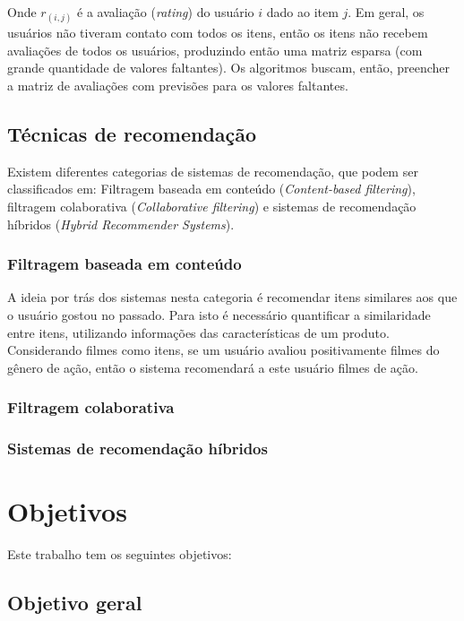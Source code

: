 \documentclass[12pt,a4paper,header]{abnt}
\begin{document}
Onde $r_{(i, j)}$ é a avaliação (\textit{rating}) do usuário $i$ dado ao item $j$. Em geral, os usuários não tiveram contato com todos os itens, então os itens não recebem avaliações de todos os usuários, produzindo então uma matriz esparsa (com grande quantidade de valores faltantes). Os algoritmos buscam, então, preencher a matriz de avaliações com previsões para os valores faltantes.

\section{Técnicas de recomendação}

Existem diferentes categorias de sistemas de recomendação, que podem ser classificados em: Filtragem baseada em conteúdo (\textit{Content-based filtering}), filtragem colaborativa (\textit{Collaborative filtering}) e sistemas de recomendação híbridos (\textit{Hybrid Recommender Systems})\cite{melville2011recommender}.

\subsection{Filtragem baseada em conteúdo}

A ideia por trás dos sistemas nesta categoria é recomendar itens similares aos que o usuário gostou no passado\cite{gorakala2015building}. Para isto é necessário quantificar a similaridade entre itens, utilizando informações das características de um produto\cite{shapira2011recommender}. Considerando filmes como itens, se um usuário avaliou positivamente filmes do gênero de ação, então o sistema recomendará a este usuário filmes de ação.

\subsection{Filtragem colaborativa}

\subsection{Sistemas de recomendação híbridos}


\chapter{Objetivos}

Este trabalho tem os seguintes objetivos:

\section{Objetivo geral}
\end{document}
